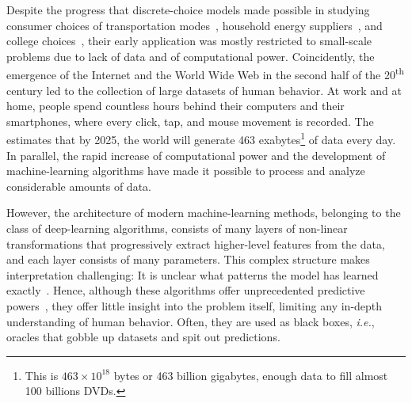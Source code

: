 Despite the progress that discrete-choice models made possible in studying consumer choices of transportation modes~\citep{ben1973structure,mcfadden1974measurement}, household energy suppliers~\citep{goett2000customers}, and college choices~\citep{fuller1982new}, their early application was mostly restricted to small-scale problems due to lack of data and of computational power.
Coincidently, the emergence of the Internet and the World Wide Web in the second half of the 20\textsuperscript{th} century led to the collection of large datasets of human behavior.
At work and at home, people spend countless hours behind their computers and their smartphones, where every click, tap, and mouse movement is recorded.
The~\citet{wef2019data} estimates that by 2025, the world will generate 463 exabytes\footnote{This is $463 \times 10^{18}$ bytes or 463 billion gigabytes, enough data to fill almost 100 billions DVDs.} of data every day.
In parallel, the rapid increase of computational power and the development of machine-learning algorithms have made it possible to process and analyze considerable amounts of data.

However, the architecture of modern machine-learning methods, belonging to the class of deep-learning algorithms, consists of many layers of non-linear transformations that progressively extract higher-level features from the data, and each layer consists of many parameters.
This complex structure makes interpretation challenging:
It is unclear what patterns the model has learned exactly~\citep{fong2017interpretable,guidotti2018survey,olah2020zoom,hilton2020understanding}.
Hence, although these algorithms offer unprecedented predictive powers~\citep{lecun2015deep}, they offer little insight into the problem itself, limiting any in-depth understanding of human behavior.
Often, they are used as black boxes, \textit{i.e.}, oracles that gobble up datasets and spit out predictions.

